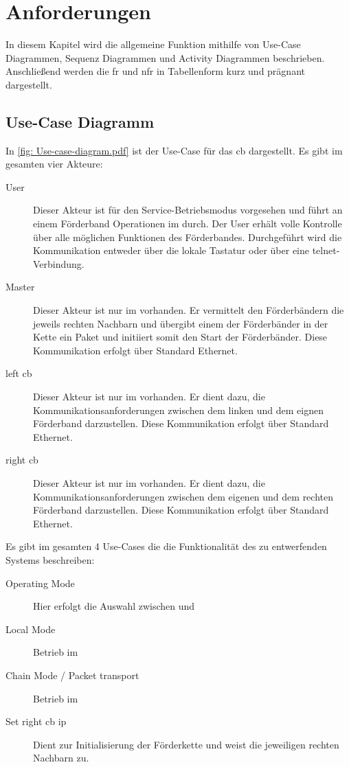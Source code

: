 \documentclass[./\jobname.tex]{subfiles}
\begin{document}
%
%
\chapter{Anforderungen}
%
In diesem Kapitel wird die allgemeine Funktion mithilfe von Use-Case Diagrammen, Sequenz Diagrammen und Activity Diagrammen beschrieben. Anschließend werden die \gls{fr} und \gls{nfr} in Tabellenform kurz und prägnant dargestellt.
%
\section{Use-Case Diagramm}
%
In \autoref{fig: Use-case-diagram.pdf} ist der Use-Case für das \gls{cb} dargestellt. Es gibt im gesamten vier Akteure:
%
\begin{description}
	\item[User] Dieser Akteur ist für den Service-Betriebsmodus vorgesehen und führt an einem Förderband Operationen im \modeA durch. Der User erhält volle Kontrolle über alle möglichen Funktionen des Förderbandes. Durchgeführt wird die Kommunikation entweder über die lokale Tastatur oder über eine \gls{telnet}-Verbindung.
	\item[Master] Dieser Akteur ist nur im \modeB vorhanden. Er vermittelt den Förderbändern die jeweils rechten Nachbarn und übergibt einem der Förderbänder in der Kette ein Paket und initiiert somit den Start der Förderbänder. Diese Kommunikation erfolgt über Standard Ethernet.
	\item[left \gls{cb}] Dieser Akteur ist nur im \modeB vorhanden. Er dient dazu, die Kommunikationsanforderungen zwischen dem linken und dem eignen Förderband darzustellen. Diese Kommunikation erfolgt über Standard Ethernet.
	\item[right \gls{cb}] Dieser Akteur ist nur im \modeB vorhanden. Er dient dazu, die Kommunikationsanforderungen zwischen dem eigenen und dem rechten Förderband darzustellen. Diese Kommunikation erfolgt über Standard Ethernet.
\end{description}
%
Es gibt im gesamten 4 Use-Cases die die Funktionalität des zu entwerfenden Systems beschreiben:
%
\begin{description}
	\item[Operating Mode] Hier erfolgt die Auswahl zwischen \modeA und \modeB
	\item[Local Mode] Betrieb im \modeA
	\item[Chain Mode / Packet transport] Betrieb im \modeB
	\item[Set right \gls{cb} \acrshort{ip}] Dient zur Initialisierung der Förderkette und weist die jeweiligen rechten Nachbarn zu.
\end{description}
\end{document}
